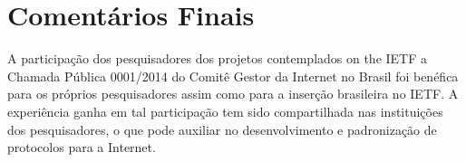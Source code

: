 \documentclass[12pt]{article}
\begin{document}
\section{Comentários Finais}


A participação dos pesquisadores dos projetos contemplados on the IETF a Chamada Pública 0001/2014 do Comitê Gestor da Internet no Brasil foi benéfica para os próprios pesquisadores assim como para a inserção brasileira no IETF. A experiência ganha em tal participação tem sido compartilhada nas instituições dos pesquisadores, o que pode auxiliar no desenvolvimento e padronização de protocolos para a Internet.



\end{document}
